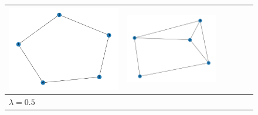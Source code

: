 \documentclass[11pt,a4paper,openright,oneside]{book}
\numberwithin{equation}{section}
\begin{document}
{\begin{figure}[h]
\begin{adjustwidth}{-3cm}{-3cm}
\begin{tabular}{>{\centering\arraybackslash}m{1.5cm} m{2.5cm} m{2.5cm} m{2.5cm} m{2.5cm} m{2.5cm}}
        \rule{0pt}{0.01cm} \includegraphics[width=\linewidth]{media/tnale/graph-4-tnale-0.25.png} \rule{0pt}{0.01cm} &
        \rule{0pt}{0.01cm} \includegraphics[width=\linewidth]{media/tnale/graph-5-tnale-0.25.png} \rule{0pt}{0.01cm} \\ \hline
        $\lambda = 0.5$ &

\end{tabular}
\end{adjustwidth}
\end{figure}}
\end{document}
